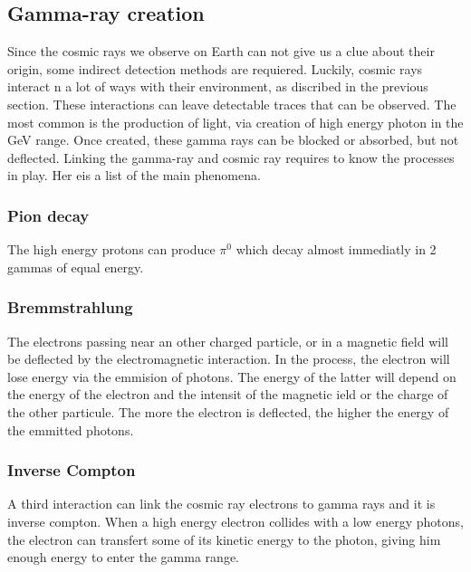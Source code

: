 \subsection{Gamma-ray creation}

Since the cosmic rays we observe on Earth can not give us a clue about their origin, some indirect detection methods are requiered. Luckily, cosmic rays interact n a lot of ways with their environment, as discribed in the previous section. These interactions can leave detectable traces that can be observed. The most common is the production of light, via creation of high energy photon in the GeV range. Once created, these gamma rays can be blocked or absorbed, but not deflected. Linking the gamma-ray and cosmic ray requires to know the processes in play. Her eis a list of the main phenomena.

\subsubsection{Pion decay}

The high energy protons can produce $\pi^{0}$ which decay almost immediatly in 2 gammas of equal energy.




\subsubsection{Bremmstrahlung}


The electrons passing near an other charged particle, or in a magnetic field will be deflected by the electromagnetic interaction. In the process, the electron will lose energy via the emmision of photons. The energy of the latter will depend on the energy of the electron and the intensit of the magnetic ield or the charge of the other particule. The more the electron is deflected, the higher the energy of the emmitted photons.


\subsubsection{Inverse Compton}


A third interaction can link the cosmic ray electrons to gamma rays and it is inverse compton. When a high energy electron collides with a low energy photons, the electron can transfert some of its kinetic energy to the photon, giving him enough energy to enter the gamma range.

